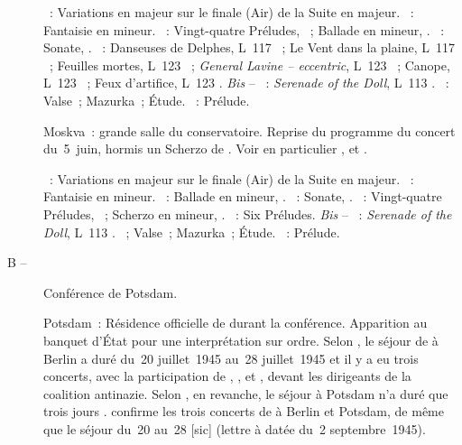 \begin{description}
 \textsc{\Haendel{}}~: Variations en \kE majeur sur le finale (Air) de la
 Suite  en \kE majeur.
 \textsc{\Mozart{}}~: Fantaisie en \kC mineur.
 \textsc{\Chopin{}}~: Vingt-quatre Préludes, ~; Ballade en \kF
 mineur, .
 \textsc{\Scriabine{}}~: Sonate, .
 \textsc{\Debussy{}}~: Danseuses de Delphes, L~117 ~; Le Vent dans
 la plaine, L~117 ~; Feuilles mortes, L~123 ~;
 \emph{General Lavine -- eccentric}, L~123 ~; Canope, L~123
 ~; Feux d'artifice, L~123 .
 \emph{Bis} -- \textsc{\Debussy{}}~: \emph{Serenade of the Doll}, L~113
 .
 \textsc{\Chopin{}}~: Valse~; Mazurka~; Étude.
 \textsc{\Scriabine{}}~: Prélude.
 \item[\DateWithWeekDay{1945-06-12}]
 Moskva~: grande salle du conservatoire.
 Reprise du programme du concert du~5~juin, hormis un Scherzo de \Chopin{}.
 Voir en particulier \citet[p.~442]{Milshteyn82a},
 \citet[p.~394]{Nikonovich08} et \citet{Lazarev20}.

 \textsc{\Haendel{}}~: Variations en \kE majeur sur le finale (Air) de la
 Suite  en \kE majeur.
 \textsc{\Mozart{}}~: Fantaisie en \kC mineur.
 \textsc{\Chopin{}}~: Ballade en \kF mineur, .
 \textsc{\Scriabine{}}~: Sonate, .
 \textsc{\Chopin{}}~: Vingt-quatre Préludes, ~; Scherzo en \kB
 \Flat mineur, .
 \textsc{\Debussy{}}~: Six Préludes.
 \emph{Bis} -- \textsc{\Debussy{}}~: \emph{Serenade of the Doll}, L~113
 .
 \textsc{\Chopin{}}~; Valse~; Mazurka~; Étude.
 \textsc{\Scriabine{}}~: Prélude.
 \item[B\DateWithWeekDay{1945-07-17} -- \DateWithWeekDay{1945-08-02}]
 Conférence de Potsdam.
 \item[\DateWithWeekDay{1945-07-21}]
 Potsdam~: Résidence officielle de \Staline{} durant la conférence.
 Apparition au banquet d'\hbox{État} pour une interprétation sur ordre.
 Selon \citet[p.~423]{Scriabine}, le séjour de \VSofronitsky{} à Berlin a
 duré du~20 juillet~1945 au~28 juillet~1945 et il y a eu trois concerts,
 avec la participation de \VSofronitsky{}, \EGuilels{}, \GBarinova{} et
 \ADedioukhine{}, devant les dirigeants de la coalition antinazie.
 Selon \RKoganSofronitskaya{}, en revanche, le séjour à Potsdam n'a duré que
 trois jours \citep[p.~95]{Artese}.
 \citet[p.~166 et~167]{Nekrasova08} confirme les trois concerts de
 \Sofronitsky{} à Berlin et Potsdam, de même que le séjour du~20 au~28
  [sic] (lettre à \AVizel{} datée du~2 septembre~1945).


\end{description}
